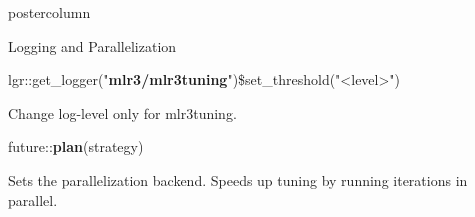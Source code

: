 \documentclass{beamer}
\begin{document}
\begin{frame}[fragile]{}
\begin{columns}
\begin{column}{.245\textwidth}
\begin{beamercolorbox}[center]{postercolumn}
\begin{minipage}{.98\textwidth}
{\begin{myblock}{Logging and Parallelization}
							\begin{codebox}
								{\scriptsize
									lgr::get\_logger("\textbf{mlr3/mlr3tuning}")\$set\_threshold("<level>")}
							\end{codebox}
							Change log-level only for mlr3tuning.\\
							\begin{codebox}
								future::\textbf{plan}(strategy)
							\end{codebox}
							Sets the parallelization backend.
							Speeds up tuning by running iterations in parallel.
						\end{myblock}
						\vfill}
				\end{minipage}
			\end{beamercolorbox}
		\end{column}
	\end{columns}
\end{frame}
\end{document}
